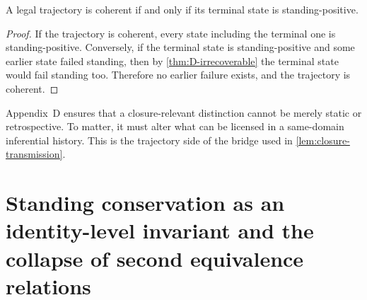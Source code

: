 \begin{theorem}
\label{thm:D-terminal}
A legal trajectory is coherent if and only if its terminal state is standing-positive.
\end{theorem}

\begin{proof}
If the trajectory is coherent, every state including the terminal one is standing-positive. Conversely, if the terminal state is standing-positive and some earlier state failed standing, then by \cref{thm:D-irrecoverable} the terminal state would fail standing too. Therefore no earlier failure exists, and the trajectory is coherent.
\end{proof}

\begin{remark}
Appendix~D ensures that a closure-relevant distinction cannot be merely static or retrospective. To matter, it must alter what can be licensed in a same-domain inferential history. This is the trajectory side of the bridge used in \cref{lem:closure-transmission}.
\end{remark}

\section{Standing conservation as an identity-level invariant and the collapse of second equivalence relations}

